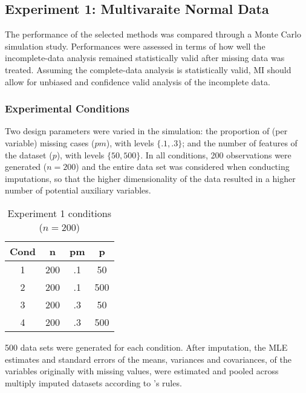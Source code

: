 \maketitle
\subsection{Experiment 1: Multivaraite Normal Data}

The performance of the selected methods was compared through a Monte Carlo simulation study. Performances
were assessed in terms of how well the incomplete-data analysis remained statistically valid after missing 
data was treated. Assuming the complete-data analysis is statistically valid, MI should allow for unbiased
and confidence valid analysis of the incomplete data.

\subsubsection{Experimental Conditions}

Two design parameters were varied in the simulation: the proportion of (per variable) missing cases ($pm$), with levels $\{.1, .3\}$; 
and the number of features of the dataset ($p$), with levels $\{50, 500\}$. 
In all conditions, 200 observations were generated ($n = 200$) and the entire data set was considered when 
conducting imputations, so that the higher dimensionality of the data resulted in a higher number of potential 
auxiliary variables.

\begin{table}[h]
	\centering
	\caption{Experiment 1 conditions ($n = 200$)}
	\break
	\begin{tabular}{ c c c c }
		Cond 	& n   & pm 	& p 	\\ 
		 \hline
		 1	& 200 & .1 	& 50  	\\  
		 2	& 200 & .1 	& 500 	\\
		 3	& 200 & .3 	& 50  	\\
		 4	& 200 & .3 	& 500 	\\
		 \hline
	\end{tabular}
	\label{table:exp1_conds}
\end{table}

500 data sets were generated for each condition. After imputation, the MLE estimates and standard errors of 
the means, variances and covariances, of the variables originally with missing values, were estimated and 
pooled across multiply imputed datasets according to \citet{rubin:1987}'s rules.

